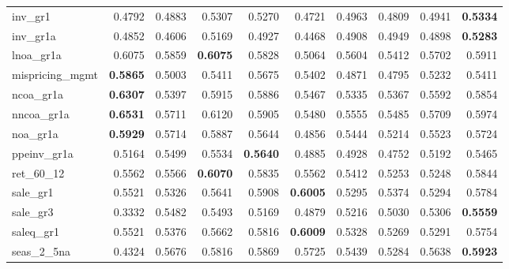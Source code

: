 \begin{longtable}{>{\raggedright\arraybackslash}p{2.6cm}rrrrrrrrr}
inv\_gr1 & 0.4792 & \cellcolor{blue!10}0.4883 & \cellcolor{blue!10}0.5307 & \cellcolor{blue!10}0.5270 & 0.4721 & \cellcolor{blue!10}0.4963 & \cellcolor{blue!10}0.4809 & \cellcolor{blue!10}0.4941 & \textbf{\cellcolor{blue!10}0.5334} \\
inv\_gr1a & 0.4852 & 0.4606 & \cellcolor{blue!10}0.5169 & \cellcolor{blue!10}0.4927 & 0.4468 & \cellcolor{blue!10}0.4908 & \cellcolor{blue!10}0.4949 & \cellcolor{blue!10}0.4898 & \textbf{\cellcolor{blue!10}0.5283} \\
lnoa\_gr1a & 0.6075 & 0.5859 & \textbf{\cellcolor{blue!10}0.6075} & 0.5828 & 0.5064 & 0.5604 & 0.5412 & 0.5702 & 0.5911 \\
mispricing\_mgmt & \textbf{0.5865} & 0.5003 & 0.5411 & 0.5675 & 0.5402 & 0.4871 & 0.4795 & 0.5232 & 0.5411 \\
ncoa\_gr1a & \textbf{0.6307} & 0.5397 & 0.5915 & 0.5886 & 0.5467 & 0.5335 & 0.5367 & 0.5592 & 0.5854 \\
nncoa\_gr1a & \textbf{0.6531} & 0.5711 & 0.6120 & 0.5905 & 0.5480 & 0.5555 & 0.5485 & 0.5709 & 0.5974 \\
noa\_gr1a & \textbf{0.5929} & 0.5714 & 0.5887 & 0.5644 & 0.4856 & 0.5444 & 0.5214 & 0.5523 & 0.5724 \\
ppeinv\_gr1a & 0.5164 & \cellcolor{blue!10}0.5499 & \cellcolor{blue!10}0.5534 & \textbf{\cellcolor{blue!10}0.5640} & 0.4885 & 0.4928 & 0.4752 & \cellcolor{blue!10}0.5192 & \cellcolor{blue!10}0.5465 \\
ret\_60\_12 & 0.5562 & \cellcolor{blue!10}0.5566 & \textbf{\cellcolor{blue!10}0.6070} & \cellcolor{blue!10}0.5835 & 0.5562 & 0.5412 & 0.5253 & 0.5248 & \cellcolor{blue!10}0.5844 \\
sale\_gr1 & 0.5521 & 0.5326 & \cellcolor{blue!10}0.5641 & \cellcolor{blue!10}0.5908 & \textbf{\cellcolor{blue!10}0.6005} & 0.5295 & 0.5374 & 0.5294 & \cellcolor{blue!10}0.5784 \\
sale\_gr3 & 0.3332 & \cellcolor{blue!10}0.5482 & \cellcolor{blue!10}0.5493 & \cellcolor{blue!10}0.5169 & \cellcolor{blue!10}0.4879 & \cellcolor{blue!10}0.5216 & \cellcolor{blue!10}0.5030 & \cellcolor{blue!10}0.5306 & \textbf{\cellcolor{blue!10}0.5559} \\
saleq\_gr1 & 0.5521 & 0.5376 & \cellcolor{blue!10}0.5662 & \cellcolor{blue!10}0.5816 & \textbf{\cellcolor{blue!10}0.6009} & 0.5328 & 0.5269 & 0.5291 & \cellcolor{blue!10}0.5754 \\
seas\_2\_5na & 0.4324 & \cellcolor{blue!10}0.5676 & \cellcolor{blue!10}0.5816 & \cellcolor{blue!10}0.5869 & \cellcolor{blue!10}0.5725 & \cellcolor{blue!10}0.5439 & \cellcolor{blue!10}0.5284 & \cellcolor{blue!10}0.5638 & \textbf{\cellcolor{blue!10}0.5923} \\

\end{longtable}
